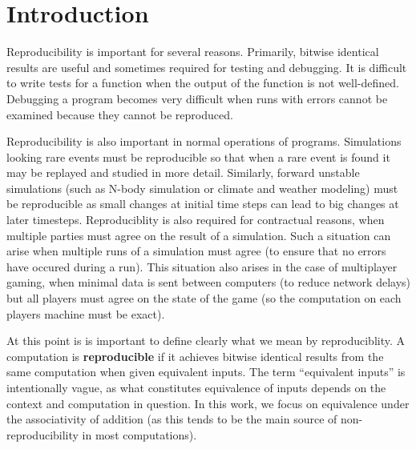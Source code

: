 \section{Introduction}
  Reproducibility is important for several reasons. Primarily, bitwise identical results are useful and sometimes required for testing and debugging. It is difficult to write tests for a function when the output of the function is not well-defined. Debugging a program becomes very difficult when runs with errors cannot be examined because they cannot be reproduced.

  Reproducibility is also important in normal operations of programs. Simulations looking rare events must be reproducible so that when a rare event is found it may be replayed and studied in more detail. Similarly, forward unstable simulations (such as N-body simulation or climate and weather modeling) must be reproducible as small changes at initial time steps can lead to big changes at later timesteps. Reproduciblity is also required for contractual reasons, when multiple parties must agree on the result of a simulation. Such a situation can arise when multiple runs of a simulation must agree (to ensure that no errors have occured during a run). This situation also arises in the case of multiplayer gaming, when minimal data is sent between computers (to reduce network delays) but all players must agree on the state of the game (so the computation on each players machine must be exact).

  At this point is is important to define clearly what we mean by reproduciblity. A computation is \textbf{reproducible} if it achieves bitwise identical results from the same computation when given equivalent inputs. The term ``equivalent inputs'' is intentionally vague, as what constitutes equivalence of inputs depends on the context and computation in question. In this work, we focus on equivalence under the associativity of addition (as this tends to be the main source of non-reproducibility in most computations). 

